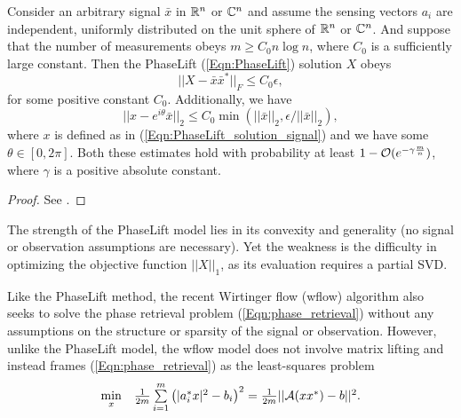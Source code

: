 \begin{theorem}  \label{Thm:PhaseLift_approx}
Consider an arbitrary signal $\bar{x}$ in ${\mathbb R}^n$ or ${\mathbb C}^n$ and assume the sensing vectors $a_i$ are independent, uniformly distributed on the unit sphere of ${\mathbb R}^n$ or ${\mathbb C}^n$.  And suppose that the number of measurements obeys $m \geq C_0 n \log n $, where $C_0$ is a sufficiently large constant.  Then the PhaseLift (\ref{Eqn:PhaseLift}) solution $X$ obeys
\begin{equation}				\label{Eqn:Thm_PhaseLift_approx_X}
||X - \bar{x}\bar{x}^*||_F \leq C_0 \epsilon,
\end{equation}
for some positive constant $C_0$.  Additionally, we have
\begin{equation}		\label{Eqn:Thm_PhaseLift_approx_x}
||x - e^{i \theta}\bar{x}||_2 \leq C_0 \min(||\bar{x}||_2, \epsilon / ||\bar{x}||_2),
\end{equation}
where $x$ is defined as in (\ref{Eqn:PhaseLift_solution_signal}) and we have some $\theta \in [0, 2\pi]$.
Both these estimates hold with probability at least $1 - {\mathcal O}(e^{-\gamma \frac{m}{n}})$, where $\gamma$ is a positive absolute constant.
\end{theorem}
\begin{proof}
See \cite[Section 6]{candes2013phaselift}.
\end{proof}


The strength of the PhaseLift model lies in its convexity and generality (no signal or observation assumptions are necessary).  Yet the weakness is the difficulty in optimizing the objective function $||X||_1$, as its evaluation requires a partial SVD.




Like the PhaseLift method, the recent Wirtinger flow (wflow) algorithm \cite{DBLP:journals/tit/CandesLS15} also seeks to solve the phase retrieval problem (\ref{Eqn:phase_retrieval}) without any assumptions on the structure or sparsity of the signal or observation.  However, unlike the PhaseLift model, the wflow model does not involve matrix lifting and instead frames (\ref{Eqn:phase_retrieval}) as the least-squares problem
\begin{equation} 				\label{Eqn:wflow_least-squares}
\begin{array}{ll}
	\min\limits_{\substack{x}}
		&	\frac{1}{2m} \sum\limits_{\substack{i=1}}^{\substack{m}} \left( |a_i^*x|^2 - b_i \right)^2
			= \frac{1}{2m} || {\mathcal A}(xx^*) - b||^2.
\end{array}
\end{equation}


